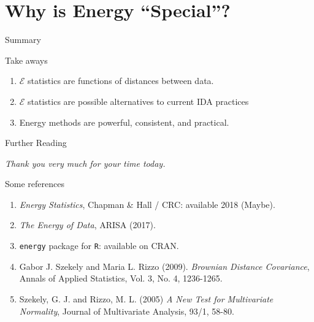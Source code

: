 \documentclass[presentation]{beamer}
\begin{document}
\section{Why is Energy ``Special''? }

\begin{frame}{Summary}
  \begin{block}{Take aways}
    \begin{enumerate}
    \item $\mathcal{E}$ statistics are functions of distances between data.
    \item $\mathcal{E}$ statistics are possible alternatives to
      current IDA practices
    \item Energy methods are powerful, consistent, and practical.
    \end{enumerate}
  \end{block}
\end{frame}

\begin{frame}{Further Reading}
  \begin{center}
    \textit{Thank you very much for your time today.}
  \end{center}

  \begin{block}{Some references}
    \begin{enumerate}
    \item \textit{Energy Statistics}, Chapman \&  Hall / CRC:
      available 2018 (Maybe).
    \item \textit{The Energy of Data}, ARISA (2017).
    \item \texttt{energy} package for \texttt{R}: available on CRAN.
    \item Gabor J. Szekely and Maria L. Rizzo (2009). \textit{Brownian Distance Covariance},
      Annals of Applied Statistics, Vol. 3, No. 4, 1236-1265. 
    \item Szekely, G. J. and Rizzo, M. L. (2005) \textit{A New Test for Multivariate Normality},
      Journal of Multivariate Analysis, 93/1, 58-80.
    \end{enumerate}
  \end{block}
\end{frame}
\end{document}
